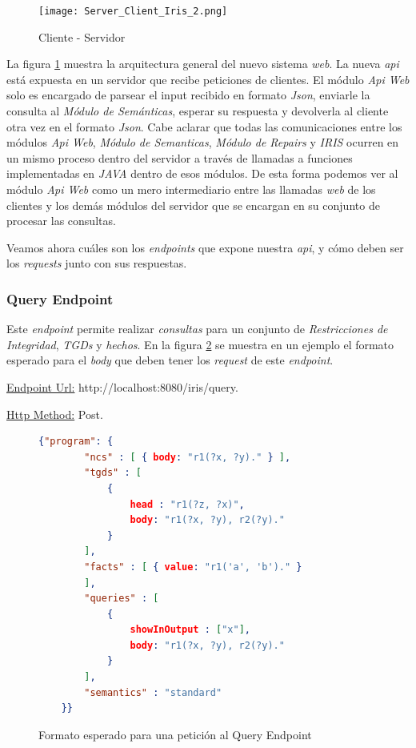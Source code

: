 \documentclass[11pt,a4paper,twoside]{tesis}
\begin{document}
\begin{figure}[ht]
    \texttt{[image: Server\_Client\_Iris\_2.png]}
    \centering
    \caption{Cliente - Servidor}
    \label{fig:server_client}
\end{figure}

La figura \ref{fig:server_client} muestra la arquitectura general del nuevo sistema \textit{web}. La nueva \textit{api} está expuesta en un servidor que recibe peticiones de clientes. El módulo \textit{Api Web} solo es encargado de parsear el input recibido en formato \textit{Json}, enviarle la consulta al \textit{Módulo de Semánticas}, esperar su respuesta y devolverla al cliente otra vez en el formato \textit{Json}. Cabe aclarar que todas las comunicaciones entre los módulos \textit{Api Web}, \textit{Módulo de Semanticas}, \textit{Módulo de Repairs} y \textit{IRIS} ocurren en un mismo proceso dentro del servidor a través de llamadas a funciones implementadas en \textit{JAVA} dentro de esos módulos. De esta forma podemos ver al módulo \textit{Api Web} como un mero intermediario entre las llamadas \textit{web} de los clientes y los demás módulos del servidor que se encargan en su conjunto de procesar las consultas.



Veamos ahora cuáles son los \textit{endpoints} que expone nuestra \textit{api}, y cómo 
deben ser los \textit{requests} junto con sus respuestas.

\subsubsection{Query Endpoint}\label{query_enpoint_section}

Este \textit{endpoint} permite realizar \textit{consultas} para un conjunto de \textit{Restricciones de Integridad}, \textit{TGDs} y \textit{hechos}. En la figura \ref{fig:query_endpoint} se muestra en un ejemplo el formato esperado para el \textit{body} que deben tener los \textit{request} de este \textit{endpoint}.

\underline{Endpoint Url:} http://localhost:8080/iris/query.

\underline{Http Method:} Post.


\begin{figure}[ht]
    \begin{lstlisting}[language=json,firstnumber=1]
    {"program": {
    	"ncs" : [ { body: "r1(?x, ?y)." } ],
        "tgds" : [
            {
            	head : "r1(?z, ?x)",
            	body: "r1(?x, ?y), r2(?y)."
            }
        ],
    	"facts" : [ { value: "r1('a', 'b')." }	
    	],
        "queries" : [
            {
                showInOutput : ["x"],
                body: "r1(?x, ?y), r2(?y)."
            }	
        ],
    	"semantics" : "standard"
    }}
    \end{lstlisting}
    \caption{Formato esperado para una petición al Query Endpoint}
    \label{fig:query_endpoint}
\end{figure}
\end{document}
